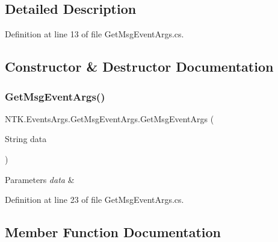 \subsection{Detailed Description}




Definition at line 13 of file Get\+Msg\+Event\+Args.\+cs.



\subsection{Constructor \& Destructor Documentation}
\mbox{\label{class_n_t_k_1_1_events_args_1_1_get_msg_event_args_a03ce547bdbc95f87c488a4f89e27960c}} 
\subsubsection{\texorpdfstring{GetMsgEventArgs()}{GetMsgEventArgs()}}
{\footnotesize\ttfamily N\+T\+K.\+Events\+Args.\+Get\+Msg\+Event\+Args.\+Get\+Msg\+Event\+Args (\begin{DoxyParamCaption}\item[{String}]{data }\end{DoxyParamCaption})}






\begin{DoxyParams}{Parameters}
{\em data} & \\
\hline
\end{DoxyParams}


Definition at line 23 of file Get\+Msg\+Event\+Args.\+cs.



\subsection{Member Function Documentation}
\mbox{\label{class_n_t_k_1_1_events_args_1_1_get_msg_event_args_a85a010980575f91d1a5e066b62a2e2e6}} 
